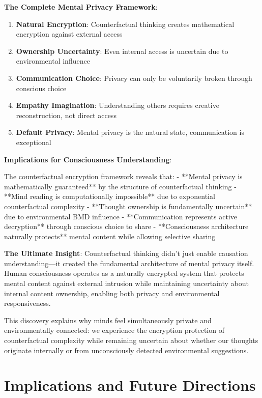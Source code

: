 \documentclass[12pt,a4paper]{article}
\begin{document}
\textbf{The Complete Mental Privacy Framework}:

\begin{enumerate}
\item \textbf{Natural Encryption}: Counterfactual thinking creates mathematical encryption against external access
\item \textbf{Ownership Uncertainty}: Even internal access is uncertain due to environmental influence
\item \textbf{Communication Choice}: Privacy can only be voluntarily broken through conscious choice
\item \textbf{Empathy Imagination}: Understanding others requires creative reconstruction, not direct access
\item \textbf{Default Privacy}: Mental privacy is the natural state, communication is exceptional
\end{enumerate}

\textbf{Implications for Consciousness Understanding}:

The counterfactual encryption framework reveals that:
- **Mental privacy is mathematically guaranteed** by the structure of counterfactual thinking
- **Mind reading is computationally impossible** due to exponential counterfactual complexity
- **Thought ownership is fundamentally uncertain** due to environmental BMD influence
- **Communication represents active decryption** through conscious choice to share
- **Consciousness architecture naturally protects** mental content while allowing selective sharing

\textbf{The Ultimate Insight}: Counterfactual thinking didn't just enable causation understanding—it created the fundamental architecture of mental privacy itself. Human consciousness operates as a naturally encrypted system that protects mental content against external intrusion while maintaining uncertainty about internal content ownership, enabling both privacy and environmental responsiveness.

This discovery explains why minds feel simultaneously private and environmentally connected: we experience the encryption protection of counterfactual complexity while remaining uncertain about whether our thoughts originate internally or from unconsciously detected environmental suggestions.

\section{Implications and Future Directions}
\end{document}
